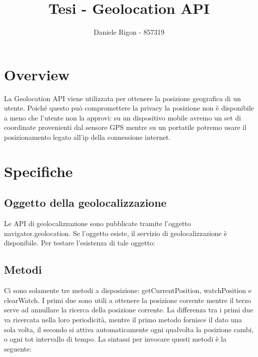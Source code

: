 \documentclass[11pt ,a4paper , twoside , openright ]{article}
\author{
	Daniele Rigon - 857319 \\
}
\begin{document}
	
\title{Tesi - Geolocation API}
\maketitle

\tableofcontents
\pagebreak

\section{Overview}
La Geolocation API viene utilizzata per ottenere la posizione geografica di un utente. 
Poiché questo può compromettere la privacy la posizione non è disponibile a meno che l'utente non la approvi: su un dispositivo mobile avremo un set di coordinate provenienti dal sensore GPS mentre su un portatile potremo usare il posizionamento legato all’ip della connessione internet.
\newpage
\section{Specifiche}

\subsection{Oggetto della geolocalizzazione}
Le API di geolocalizzazione sono pubblicate tramite l'oggetto navigator.geolocation. Se l'oggetto esiste, il servizio di geolocalizzazione è disponibile. Per testare l'esistenza di tale oggetto:


\subsection{Metodi}
Ci sono solamente tre metodi a disposizione: getCurrentPosition, watchPosition e clearWatch. I primi due sono utili a ottenere la posizione corrente mentre il terzo serve ad annullare la ricerca della posizione corrente. 
La differenza tra i primi due va ricercata nella loro periodicità, mentre il primo metodo fornisce il dato una sola volta, il secondo si attiva automaticamente ogni qualvolta la posizione cambi, o ogni tot intervallo di tempo.
La sintassi per invocare questi metodi è la seguente:

\end{document}

